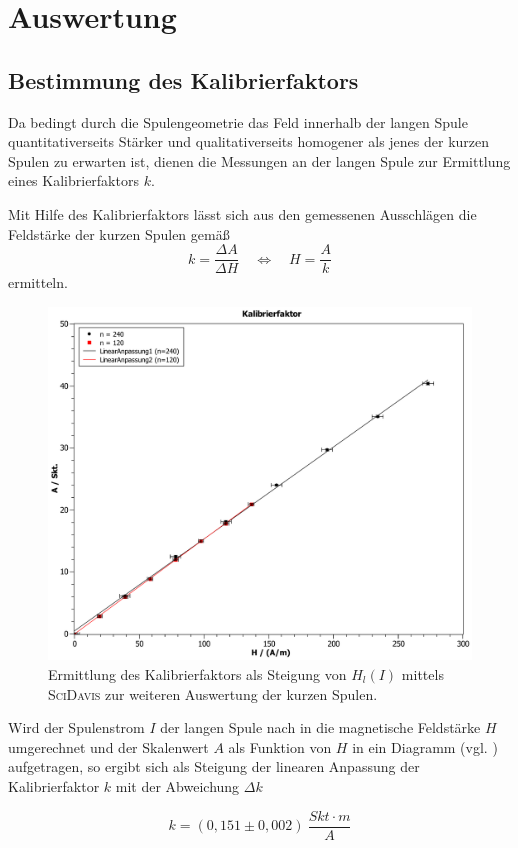 \chapter{Auswertung}
\section{Bestimmung des Kalibrierfaktors}
Da bedingt durch die Spulengeometrie das Feld innerhalb der langen Spule quantitativerseits Stärker und qualitativerseits
homogener als jenes der kurzen Spulen zu erwarten ist, dienen die Messungen an der langen Spule zur Ermittlung eines
Kalibrierfaktors $k$.\par
Mit Hilfe des Kalibrierfaktors lässt sich aus den gemessenen Ausschlägen die Feldstärke der kurzen Spulen gemäß 
\begin{equation}
    k=\frac{\Delta A}{\Delta H} \quad \Leftrightarrow \quad H=\frac{A}{k}
    \label{eq:k}
\end{equation}
ermitteln.

\begin{figure}[H]
    \centering
    \includegraphics[width=.7\textwidth]{Kalibrierfaktor.pdf}
    \caption[Ermittlung des Kalibrierfaktors]{Ermittlung des Kalibrierfaktors als Steigung von $H_{l}(I)$ mittels \textsc{SciDavis} zur weiteren Auswertung der kurzen Spulen.}
    \label{fig:kalib}
\end{figure}

Wird der Spulenstrom $ I $ der langen Spule nach  in die magnetische Feldstärke $ H $ umgerechnet und der Skalenwert
$ A $ als Funktion von $ H $ in ein Diagramm (vgl. ) aufgetragen, so ergibt sich als Steigung der linearen
Anpassung der Kalibrierfaktor $ k $ mit der Abweichung $ \Delta k $

\begin{equation} 
    k = (0,151 \pm 0,002)\SI{}{\frac{Skt\cdot m}{A}}
\end{equation}

